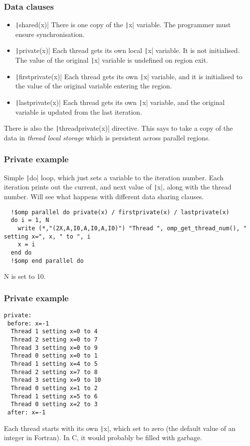 \documentclass{beamer}
\begin{document}
\begin{frame}
\frametitle{Data clauses}
\begin{itemize}
  \item \texttt|shared(x)|
    There is one copy of the \texttt|x| variable. The programmer must ensure synchronisation.
  \item \texttt|private(x)|
    Each thread gets its own local \texttt|x| variable. It is not initialised. The value of the original \texttt|x| variable is undefined on region exit.
  \item \texttt|firstprivate(x)|
    Each thread gets its own \texttt|x| variable, and it is initialised to the value of the original variable entering the region.
  \item \texttt|lastprivate(x)|
    Each thread gets its own \texttt|x| variable, and the original variable is updated from the last iteration.
\end{itemize}

There is also the \texttt|threadprivate(x)| directive.
This says to take a copy of the data in \emph{thread local storage} which is persistent across parallel regions.
\end{frame}

\begin{frame}[fragile]
\frametitle{Private example}
Simple \texttt|do| loop, which just sets a variable to the iteration number.
Each iteration prints out the current, and next value of \texttt|x|, along with the thread number.
Will see what happens with different data sharing clauses.

\begin{verbatim}
  !$omp parallel do private(x) / firstprivate(x) / lastprivate(x)
  do i = 1, N
    write (*,"(2X,A,I0,A,I0,A,I0)") "Thread ", omp_get_thread_num(), " setting x=", x, " to ", i
    x = i
  end do
  !$omp end parallel do
\end{verbatim}
N is set to 10.
\end{frame}

\begin{frame}[fragile]
\frametitle{Private example}
\begin{verbatim}
private:
 before: x=-1
  Thread 1 setting x=0 to 4
  Thread 2 setting x=0 to 7
  Thread 3 setting x=0 to 9
  Thread 0 setting x=0 to 1
  Thread 1 setting x=4 to 5
  Thread 2 setting x=7 to 8
  Thread 3 setting x=9 to 10
  Thread 0 setting x=1 to 2
  Thread 1 setting x=5 to 6
  Thread 0 setting x=2 to 3
 after: x=-1
\end{verbatim}
Each thread starts with its own \texttt|x|, which set to zero (the default value of an integer in Fortran).
In C, it would probably be filled with garbage.
\end{frame}
\end{document}
